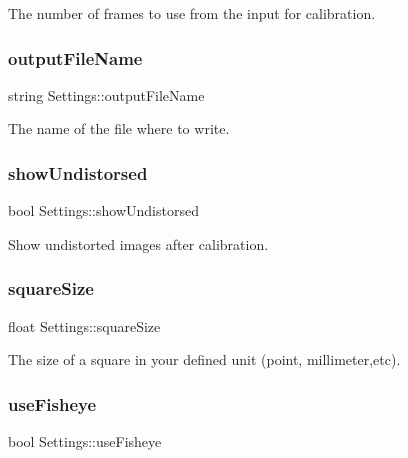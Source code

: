 The number of frames to use from the input for calibration. 

\mbox{\label{class_settings_a9468f1ad53e982f9541d76c8d3228900}} 
\subsubsection{\texorpdfstring{output\+File\+Name}{outputFileName}}
{\footnotesize\ttfamily string Settings\+::output\+File\+Name}



The name of the file where to write. 

\mbox{\label{class_settings_a935d6f27ee454e9fee63f8b662f48a06}} 
\subsubsection{\texorpdfstring{show\+Undistorsed}{showUndistorsed}}
{\footnotesize\ttfamily bool Settings\+::show\+Undistorsed}



Show undistorted images after calibration. 

\mbox{\label{class_settings_a6c94708776ad1ce258fc44f2101f5941}} 
\subsubsection{\texorpdfstring{square\+Size}{squareSize}}
{\footnotesize\ttfamily float Settings\+::square\+Size}



The size of a square in your defined unit (point, millimeter,etc). 

\mbox{\label{class_settings_ac8f271630d54f9d0c718ea0130972d44}} 
\subsubsection{\texorpdfstring{use\+Fisheye}{useFisheye}}
{\footnotesize\ttfamily bool Settings\+::use\+Fisheye}



